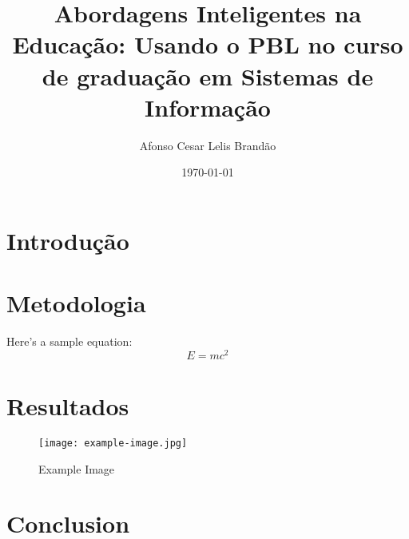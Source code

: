 \documentclass{article}
\title{Abordagens Inteligentes na Educação: Usando o PBL no curso de graduação em Sistemas de Informação}
\author{Afonso Cesar Lelis Brandão}
\date{\today}
\begin{document}
\maketitle

\section{Introdução}
\lipsum[1] %

\section{Metodologia}
Here's a sample equation:
\begin{equation}
    E = mc^2
\end{equation}

\section{Resultados}
\lipsum[2] %

\begin{figure}[ht]
    \centering
    \texttt{[image: example-image.jpg]}
    \caption{Example Image}
    \label{fig:example}
\end{figure}

\section{Conclusion}
\lipsum[3] %
\end{document}
